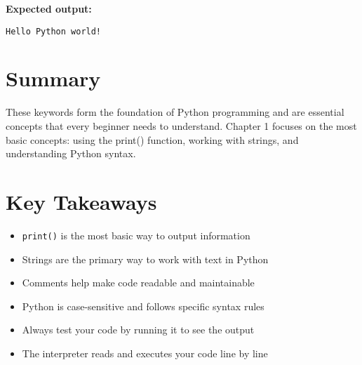 \textbf{Expected output:}
\begin{verbatim}
Hello Python world!
\end{verbatim}

\section*{Summary}
These keywords form the foundation of Python programming and are essential concepts that every beginner needs to understand. Chapter 1 focuses on the most basic concepts: using the print() function, working with strings, and understanding Python syntax.

\section*{Key Takeaways}
\begin{itemize}
    \item \texttt{print()} is the most basic way to output information
    \item Strings are the primary way to work with text in Python
    \item Comments help make code readable and maintainable
    \item Python is case-sensitive and follows specific syntax rules
    \item Always test your code by running it to see the output
    \item The interpreter reads and executes your code line by line
\end{itemize} 
